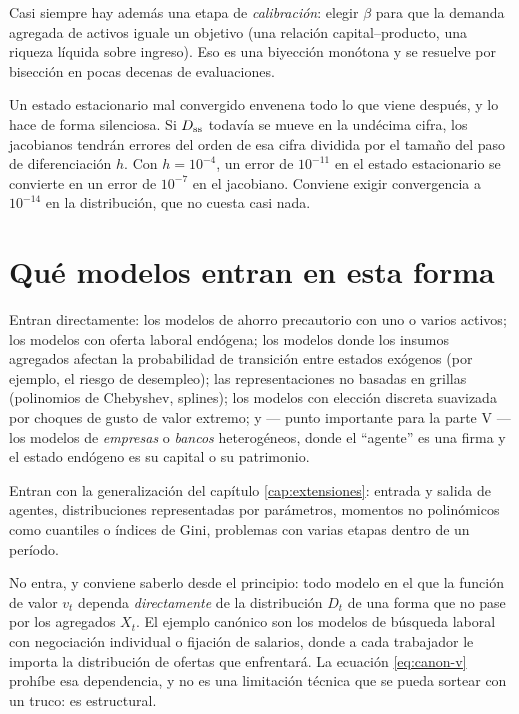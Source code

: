 Casi siempre hay además una etapa de \emph{calibración}: elegir $\beta$ para que
la demanda agregada de activos iguale un objetivo (una relación capital--producto,
una riqueza líquida sobre ingreso). Eso es una biyección monótona y se resuelve
por bisección en pocas decenas de evaluaciones.

\begin{trampa}
Un estado estacionario mal convergido envenena todo lo que viene después, y lo
hace de forma silenciosa. Si $D_{\mathrm{ss}}$ todavía se mueve en la undécima cifra, los
jacobianos tendrán errores del orden de esa cifra dividida por el tamaño del
paso de diferenciación $h$. Con $h=10^{-4}$, un error de $10^{-11}$ en el estado
estacionario se convierte en un error de $10^{-7}$ en el jacobiano. Conviene
exigir convergencia a $10^{-14}$ en la distribución, que no cuesta casi nada.
\end{trampa}

\section{Qué modelos entran en esta forma}

Entran directamente: los modelos de ahorro precautorio con uno o varios activos;
los modelos con oferta laboral endógena; los modelos donde los insumos agregados
afectan la probabilidad de transición entre estados exógenos (por ejemplo, el
riesgo de desempleo); las representaciones no basadas en grillas (polinomios de
Chebyshev, splines); los modelos con elección discreta suavizada por choques de
gusto de valor extremo; y --- punto importante para la parte V --- los modelos
de \emph{empresas} o \emph{bancos} heterogéneos, donde el ``agente'' es una
firma y el estado endógeno es su capital o su patrimonio.

Entran con la generalización del capítulo \ref{cap:extensiones}: entrada y
salida de agentes, distribuciones representadas por parámetros, momentos no
polinómicos como cuantiles o índices de Gini, problemas con varias etapas dentro
de un período.

No entra, y conviene saberlo desde el principio: todo modelo en el que la
función de valor $v_t$ dependa \emph{directamente} de la distribución $D_t$ de
una forma que no pase por los agregados $X_t$. El ejemplo canónico son los
modelos de búsqueda laboral con negociación individual o fijación de salarios,
donde a cada trabajador le importa la distribución de ofertas que enfrentará.
La ecuación \eqref{eq:canon-v} prohíbe esa dependencia, y no es una limitación
técnica que se pueda sortear con un truco: es estructural.
